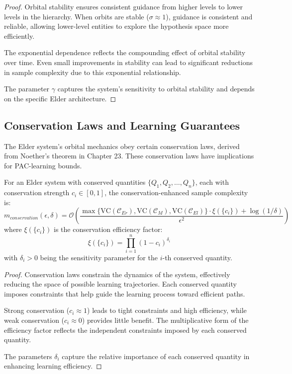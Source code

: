 \begin{proof}
Orbital stability ensures consistent guidance from higher levels to lower levels in the hierarchy. When orbits are stable ($\sigma \approx 1$), guidance is consistent and reliable, allowing lower-level entities to explore the hypothesis space more efficiently.

The exponential dependence reflects the compounding effect of orbital stability over time. Even small improvements in stability can lead to significant reductions in sample complexity due to this exponential relationship.

The parameter $\gamma$ captures the system's sensitivity to orbital stability and depends on the specific Elder architecture.
\end{proof}

\subsection{Conservation Laws and Learning Guarantees}

The Elder system's orbital mechanics obey certain conservation laws, derived from Noether's theorem in Chapter 23. These conservation laws have implications for PAC-learning bounds.

\begin{theorem}
For an Elder system with conserved quantities $\{Q_1, Q_2, \ldots, Q_n\}$, each with conservation strength $c_i \in [0, 1]$, the conservation-enhanced sample complexity is:
\begin{equation}
m_{conservation}(\epsilon, \delta) = \mathcal{O}\left(\frac{\max\{\text{VC}(\mathcal{C}_{Er}), \text{VC}(\mathcal{C}_{M}), \text{VC}(\mathcal{C}_{El})\} \cdot \xi(\{c_i\}) + \log(1/\delta)}{\epsilon^2}\right)
\end{equation}
where $\xi(\{c_i\})$ is the conservation efficiency factor:
\begin{equation}
\xi(\{c_i\}) = \prod_{i=1}^{n} (1 - c_i)^{\delta_i}
\end{equation}
with $\delta_i > 0$ being the sensitivity parameter for the $i$-th conserved quantity.
\end{theorem}

\begin{proof}
Conservation laws constrain the dynamics of the system, effectively reducing the space of possible learning trajectories. Each conserved quantity imposes constraints that help guide the learning process toward efficient paths.

Strong conservation ($c_i \approx 1$) leads to tight constraints and high efficiency, while weak conservation ($c_i \approx 0$) provides little benefit. The multiplicative form of the efficiency factor reflects the independent constraints imposed by each conserved quantity.

The parameters $\delta_i$ capture the relative importance of each conserved quantity in enhancing learning efficiency.
\end{proof}

